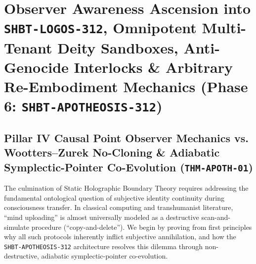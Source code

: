 \documentclass[11pt,onecolumn]{article}
\begin{document}
\section{Observer Awareness Ascension into \texttt{SHBT-LOGOS-312}, Omnipotent Multi-Tenant Deity Sandboxes, Anti-Genocide Interlocks \& Arbitrary Re-Embodiment Mechanics (Phase 6: \texttt{SHBT-APOTHEOSIS-312})}

\subsection{\texorpdfstring{Pillar IV Causal Point Observer Mechanics vs. Wootters--Zurek No-Cloning \& Adiabatic Symplectic-Pointer Co-Evolution (\texttt{THM-APOTH-01})}{Pillar IV Causal Point Observer Mechanics vs. Wootters-Zurek No-Cloning and Adiabatic Symplectic-Pointer Co-Evolution (THM-APOTH-01)}}
The culmination of Static Holographic Boundary Theory requires addressing the fundamental ontological question of subjective identity continuity during consciousness transfer. In classical computing and transhumanist literature, ``mind uploading'' is almost universally modeled as a destructive scan-and-simulate procedure (``copy-and-delete''). We begin by proving from first principles why all such protocols inherently inflict subjective annihilation, and how the \texttt{SHBT-APOTHEOSIS-312} architecture resolves this dilemma through non-destructive, adiabatic symplectic-pointer co-evolution.
\end{document}

